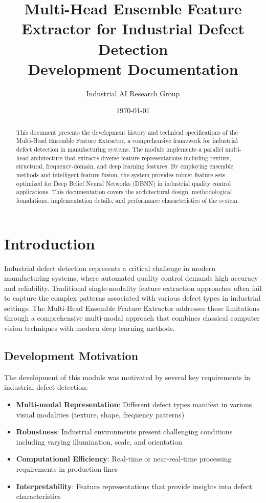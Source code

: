 \documentclass[12pt,a4paper]{article}
\title{Multi-Head Ensemble Feature Extractor for Industrial Defect Detection\\Development Documentation}
\author{Industrial AI Research Group}
\date{\today}
\begin{document}
\maketitle

\begin{abstract}
This document presents the development history and technical specifications of the Multi-Head Ensemble Feature Extractor, a comprehensive framework for industrial defect detection in manufacturing systems. The module implements a parallel multi-head architecture that extracts diverse feature representations including texture, structural, frequency-domain, and deep learning features. By employing ensemble methods and intelligent feature fusion, the system provides robust feature sets optimized for Deep Belief Neural Networks (DBNN) in industrial quality control applications. This documentation covers the architectural design, methodological foundations, implementation details, and performance characteristics of the system.
\end{abstract}

\tableofcontents

\section{Introduction}

Industrial defect detection represents a critical challenge in modern manufacturing systems, where automated quality control demands high accuracy and reliability. Traditional single-modality feature extraction approaches often fail to capture the complex patterns associated with various defect types in industrial settings. The Multi-Head Ensemble Feature Extractor addresses these limitations through a comprehensive multi-modal approach that combines classical computer vision techniques with modern deep learning methods.

\subsection{Development Motivation}

The development of this module was motivated by several key requirements in industrial defect detection:

\begin{itemize}
    \item \textbf{Multi-modal Representation}: Different defect types manifest in various visual modalities (texture, shape, frequency patterns)
    \item \textbf{Robustness}: Industrial environments present challenging conditions including varying illumination, scale, and orientation
    \item \textbf{Computational Efficiency}: Real-time or near-real-time processing requirements in production lines
    \item \textbf{Interpretability}: Feature representations that provide insights into defect characteristics
\end{itemize}
\end{document}
